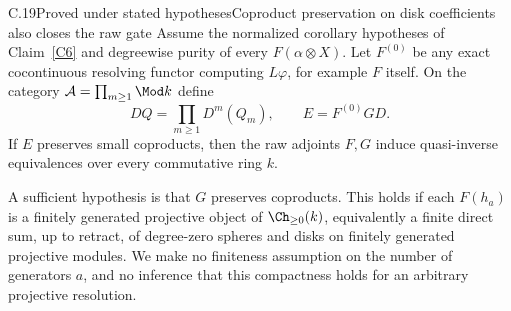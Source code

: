 \begin{claim}{C.19}{Proved under stated hypotheses}{Coproduct preservation on disk coefficients also closes the raw gate}\label{C19}
Assume the normalized corollary hypotheses of Claim~\ref{C6} and degreewise purity of every $F(\alpha\otimes X)$. Let $F^{(0)}$ be any exact cocontinuous resolving functor computing $L\varphi$, for example $F$ itself. On the category $\mathcal A=\prod_{m\geq1}\Mod k$ define
\[
 DQ=\prod_{m\geq1}D^m(Q_m),\qquad E=F^{(0)}GD.
\]
If $E$ preserves small coproducts, then the raw adjoints $F,G$ induce quasi-inverse equivalences over every commutative ring $k$.

A sufficient hypothesis is that $G$ preserves coproducts. This holds if each $F(h_a)$ is a finitely generated projective object of $\Ch_{\geq0}(k)$, equivalently a finite direct sum, up to retract, of degree-zero spheres and disks on finitely generated projective modules. We make no finiteness assumption on the number of generators $a$, and no inference that this compactness holds for an arbitrary projective resolution.
\end{claim}
